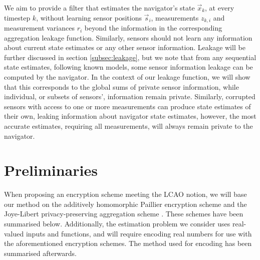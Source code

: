 \documentclass[10pt,letterpaper,oneside,twocolumn,journal]{IEEEtran}
\theoremstyle{definition}
\theoremstyle{definition}
\theoremstyle{remark}
\begin{document}
We aim to provide a filter that estimates the navigator's state $\vec{x}_k$, at every timestep $k$, without learning sensor positions $\vec{s}_i$, measurements $z_{k,i}$ and measurement variances $r_i$ beyond the information in the corresponding aggregation leakage function. Similarly, sensors should not learn any information about current state estimates or any other sensor information. Leakage will be further discussed in section \ref{subsec:leakage}, but we note that from any sequential state estimates, following known models, some sensor information leakage can be computed by the navigator. In the context of our leakage function, we will show that this corresponds to the global sums of private sensor information, while individual, or subsets of sensors', information remain private. Similarly, corrupted sensors with access to one or more measurements can produce state estimates of their own, leaking information about navigator state estimates, however, the most accurate estimates, requiring all measurements, will always remain private to the navigator.

% 
%                                                                            
%                                                                            
%                                                                            
% 

\section{Preliminaries} \label{sec:preliminaries}
When proposing an encryption scheme meeting the LCAO notion, we will base our method on the additively homomorphic Paillier encryption scheme \cite{paillierPublicKeyCryptosystemsBased1999} and the Joye-Libert privacy-preserving aggregation scheme \cite{joyeScalableSchemePrivacyPreserving2013}. These schemes have been summarised below. Additionally, the estimation problem we consider uses real-valued inputs and functions, and will require encoding real numbers for use with the aforementioned encryption schemes. The method used for encoding has been summarised afterwards.
\end{document}
